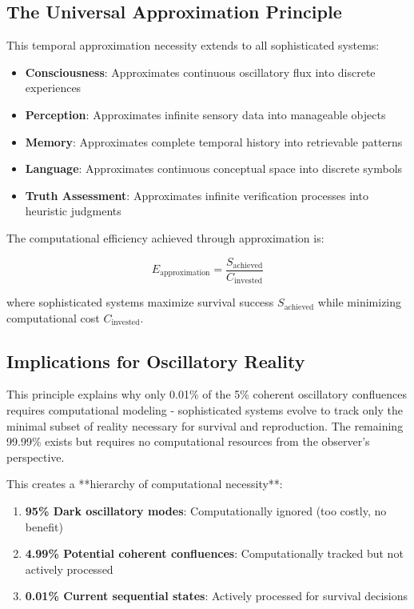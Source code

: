 \documentclass[11pt]{article}
\theoremstyle{remark}
\begin{document}
\subsection{The Universal Approximation Principle}

This temporal approximation necessity extends to all sophisticated systems:

\begin{itemize}
\item \textbf{Consciousness}: Approximates continuous oscillatory flux into discrete experiences
\item \textbf{Perception}: Approximates infinite sensory data into manageable objects
\item \textbf{Memory}: Approximates complete temporal history into retrievable patterns
\item \textbf{Language}: Approximates continuous conceptual space into discrete symbols
\item \textbf{Truth Assessment}: Approximates infinite verification processes into heuristic judgments
\end{itemize}

The computational efficiency achieved through approximation is:

$$E_{\text{approximation}} = \frac{S_{\text{achieved}}}{C_{\text{invested}}}$$

where sophisticated systems maximize survival success $S_{\text{achieved}}$ while minimizing computational cost $C_{\text{invested}}$.

\subsection{Implications for Oscillatory Reality}

This principle explains why only 0.01\% of the 5\% coherent oscillatory confluences requires computational modeling - sophisticated systems evolve to track only the minimal subset of reality necessary for survival and reproduction. The remaining 99.99\% exists but requires no computational resources from the observer's perspective.

This creates a **hierarchy of computational necessity**:
\begin{enumerate}
\item \textbf{95\% Dark oscillatory modes}: Computationally ignored (too costly, no benefit)
\item \textbf{4.99\% Potential coherent confluences}: Computationally tracked but not actively processed
\item \textbf{0.01\% Current sequential states}: Actively processed for survival decisions
\end{enumerate}
\end{document}
